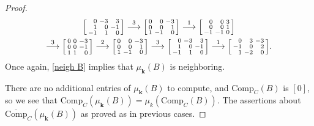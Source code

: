 \documentclass{amsart}
\theoremstyle{definition}
\theoremstyle{remark}
\numberwithin{equation}{section}
\newcommand{\0}{{\mathbf{0}}}
\newcommand{\Comp}{\mathrm{Comp}_C}
\newcommand{\CompPlus}{\overline{\mathrm{Comp}}_C}
\newcommand{\kk}{\mathbf{k}}
\begin{document}
\begin{proof}
\begin{multline*}
\begin{bsmallmatrix*}[r]
0&-3&3\\
1&0&-1\\
-1&1&0
\end{bsmallmatrix*}
\overset{3}{\longrightarrow}
\begin{bsmallmatrix*}[r]
0&0&-3\\
0&0&1\\
1&-1&0
\end{bsmallmatrix*}
\overset{1}{\longrightarrow}
\begin{bsmallmatrix*}[r]
0&0&3\\
0&0&1\\
-1&-1&0
\end{bsmallmatrix*}\\
\overset{3}{\longrightarrow}
\begin{bsmallmatrix*}[r]
0&0&-3\\
0&0&-1\\
1&1&0
\end{bsmallmatrix*}
\overset{2}{\longrightarrow}
\begin{bsmallmatrix*}[r]
0&0&-3\\
0&0&1\\
1&-1&0
\end{bsmallmatrix*}
\overset{3}{\longrightarrow}
\begin{bsmallmatrix*}[r]
0&-3&3\\
1&0&-1\\
-1&1&0
\end{bsmallmatrix*}
\overset{1}{\longrightarrow}
\begin{bsmallmatrix*}[r]
0&3&-3\\
-1&0&2\\
1&-2&0
\end{bsmallmatrix*}.
\end{multline*}
Once again, \cref{neigh B} implies that $\mu_\kk(B)$ is neighboring.

There are no additional entries of $\mu_\kk(B)$ to compute, and $\Comp(B)$ is $[0]$, so we see that $\Comp(\mu_\kk(B))=\mu_k(\Comp(B))$.
The assertions about $\CompPlus(\mu_\kk(B))$ as proved as in previous cases.


\end{proof}
\end{document}
